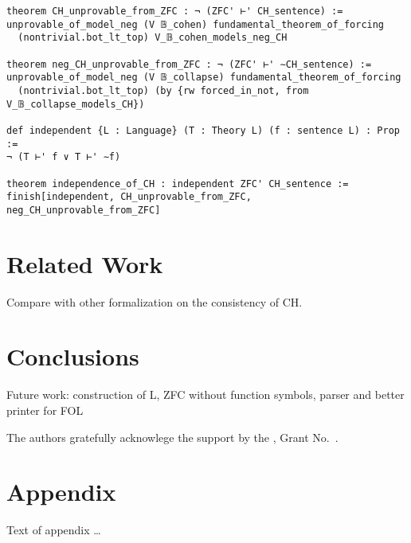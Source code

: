 \documentclass[sigplan,10pt,review, anonymous]{acmart}
\theoremstyle{definition}
\begin{document}
\begin{lstlisting}
theorem CH_unprovable_from_ZFC : ¬ (ZFC' ⊢' CH_sentence) :=
unprovable_of_model_neg (V 𝔹_cohen) fundamental_theorem_of_forcing
  (nontrivial.bot_lt_top) V_𝔹_cohen_models_neg_CH

theorem neg_CH_unprovable_from_ZFC : ¬ (ZFC' ⊢' ∼CH_sentence) :=
unprovable_of_model_neg (V 𝔹_collapse) fundamental_theorem_of_forcing
  (nontrivial.bot_lt_top) (by {rw forced_in_not, from V_𝔹_collapse_models_CH})

def independent {L : Language} (T : Theory L) (f : sentence L) : Prop :=
¬ (T ⊢' f ∨ T ⊢' ∼f)

theorem independence_of_CH : independent ZFC' CH_sentence :=
finish[independent, CH_unprovable_from_ZFC, neg_CH_unprovable_from_ZFC]
\end{lstlisting}

\section{Related Work}
\label{section:related-work}
Compare with other formalization on the consistency of CH.


\section{Conclusions}
\label{section:conclusions}
Future work: construction of L, ZFC without function symbols, parser and better printer for FOL

\begin{acks}                            %
  The authors gratefully acknowlege the support by the
  , Grant
  No.~.
\end{acks}



\appendix
\section{Appendix}

Text of appendix \ldots
\end{document}
